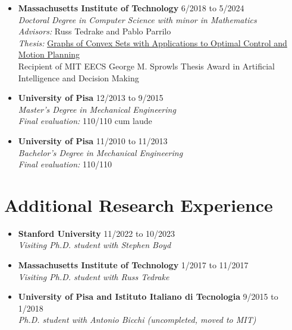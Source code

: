 \documentclass[11pt,a4paper,sans]{moderncv}
\begin{document}
\begin{itemize}

\item \textbf{Massachusetts Institute of Technology} \hfill 6/2018 to 5/2024 \\
\textit{Doctoral Degree in Computer Science with minor in Mathematics} \\
\textit{Advisors:} Russ Tedrake and Pablo Parrilo \\
\textit{Thesis:} \href{http://groups.csail.mit.edu/robotics-center/public_papers/Marcucci24a.pdf}{\color{cyan}Graphs of Convex Sets with Applications to Optimal Control and Motion Planning} \\
Recipient of MIT EECS George M. Sprowls Thesis Award in Artificial Intelligence and Decision Making

\item \textbf{University of Pisa} \hfill 12/2013 to 9/2015 \\
\textit{Master's Degree in Mechanical Engineering} \\
\textit{Final evaluation:} 110/110 cum laude

\item \textbf{University of Pisa} \hfill 11/2010 to 11/2013 \\
\textit{Bachelor's Degree in Mechanical Engineering} \\
\textit{Final evaluation:} 110/110
	
\end{itemize}

\section{Additional Research Experience}

\begin{itemize}

\item \textbf{Stanford University} \hfill 11/2022 to 10/2023 \\
\textit{Visiting Ph.D. student with Stephen Boyd}

\item \textbf{Massachusetts Institute of Technology} \hfill 1/2017 to 11/2017 \\
\textit{Visiting Ph.D. student with Russ Tedrake}

\item \textbf{University of Pisa and Istituto Italiano di Tecnologia} \hfill 9/2015 to 1/2018 \\
\textit{Ph.D. student with Antonio Bicchi (uncompleted, moved to MIT)}

\end{itemize}
\end{document}
